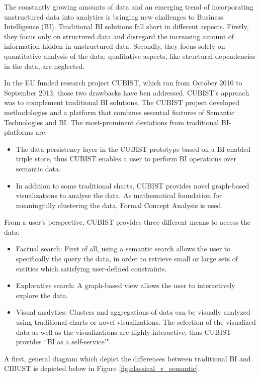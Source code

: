The constantly growing amounts of data and an emerging trend of incorporating unstructured  data into analytics is bringing new challenges to Business Intelligence (BI). Traditional BI solutions fall short in different aspects. Firstly, they focus only on structured data and disregard the increasing amount of information hidden in unstructured data. Secondly, they focus solely on quantitative analysis of the data: qualitative aspects, like structural dependencies in the data, are neglected. 

In the EU funded research project CUBIST, which ran from October 2010 to September 2013, those two drawbacks have ben addressed. CUBIST's approach was to complement traditional BI solutions. The CUBIST project developed methodologies and a platform that combines essential features of Semantic Technologies and BI. The most-prominent deviations from traditional BI-platforms are:
\begin{itemize}
\item The data persistency layer in the CUBIST-prototype based on a BI enabled triple store, thus CUBIST enables a user to perform BI operations over semantic data.
\item  In addition to some traditional charts, CUBIST provides novel graph-based visualizations to analyse the data.  As mathematical foundation for meaningfully clustering the data, Formal Concept Analysis is used.
\end{itemize}

From a user's perspective, CUBIST provides three different means to access the data:
\begin{itemize}
\item Factual search: First of all, using a semantic search allows the user to specifically the query the data, in order to retrieve small or large sets of entities which satisfying user-defined constraints. 
\item Explorative search: A graph-based view allows the user to interactively explore the data.
\item Visual analytics: Clusters and aggregations of data can be visually analyzed using traditional charts or novel visualizations. The selection of the visualized data as well as the visualizations are highly interactive, thus CUBIST provides ``BI as a self-service'".
\end{itemize}

A first, general diagram which depict the differences between traditional BI and CIBUST is depicted below in Figure \ref{fig:classical_v_semantic}.

